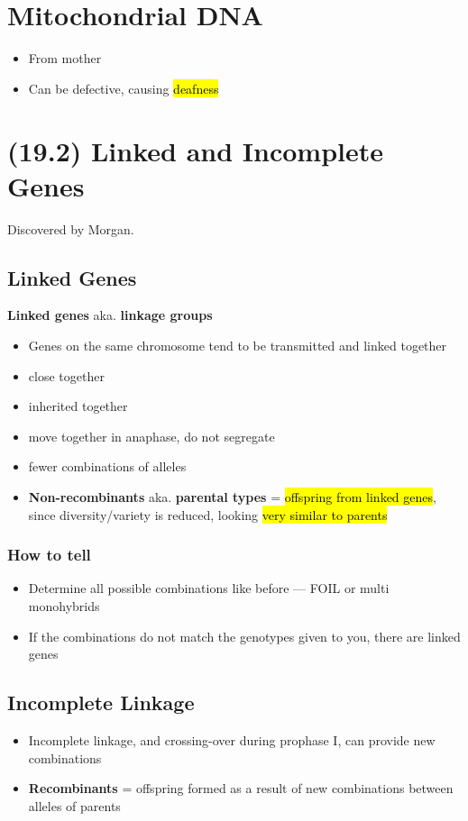 \documentclass[a4paper,12pt]{article}
\begin{document}
\section{Mitochondrial DNA}
\begin{itemize}
    \item{From mother}
    \item{Can be defective, causing \hl{deafness}}
\end{itemize}

\pagebreak

\section{(19.2) Linked and Incomplete Genes}
Discovered by Morgan.

\subsection{Linked Genes}
\textbf{Linked genes} aka. \textbf{linkage groups}
\begin{itemize}
    \item{Genes on the same chromosome tend to be transmitted and linked together}
    \item{close together}
    \item{inherited together}
    \item{move together in anaphase, do not segregate}
    \item{fewer combinations of alleles}
    \item{\textbf{Non-recombinants} aka. \textbf{parental types} = \hl{offspring from linked genes}, since diversity/variety is reduced, looking \hl{very similar to parents}}
\end{itemize}

\subsubsection{How to tell}
\begin{itemize}
    \item{Determine all possible combinations like before --- FOIL or multi monohybrids}
    \item{If the combinations do not match the genotypes given to you, there are linked genes}
\end{itemize}

\subsection{Incomplete Linkage}
\begin{itemize}
    \item{Incomplete linkage, and crossing-over during prophase I, can provide new combinations}
    \item{\textbf{Recombinants} = offspring formed as a result of new combinations between alleles of parents}
\end{itemize}
\end{document}
